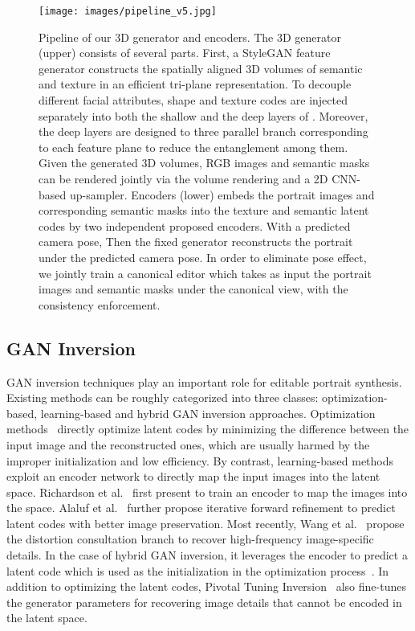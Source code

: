 \documentclass[acmtog]{acmart}
\begin{document}
\begin{figure*}[htbp]
  \centering
  \texttt{[image: images/pipeline\_v5.jpg]}
  \caption{Pipeline of our 3D generator and encoders. The 3D generator (upper) consists of several parts. First, a StyleGAN feature generator  constructs the spatially aligned 3D volumes of semantic and texture in an efficient tri-plane representation. To decouple different facial attributes, shape and texture codes are injected separately into both the shallow and the deep layers of . Moreover, the deep layers are designed to three parallel branch corresponding to each feature plane to reduce the entanglement among them. Given the generated 3D volumes, RGB images and semantic masks can be rendered jointly via the volume rendering and a 2D CNN-based up-sampler. Encoders (lower) embeds the portrait images and corresponding semantic masks into the texture and semantic latent codes by two independent proposed encoders. With a predicted camera pose, Then the fixed generator reconstructs the portrait under the predicted camera pose. In order to eliminate pose effect, we jointly train a canonical editor which takes as input the portrait images and semantic masks under the canonical view, with the consistency enforcement.}
  \Description{}
  \label{pipeline}
\end{figure*}

\subsection{GAN Inversion}

GAN inversion techniques play an important role for editable portrait synthesis. Existing methods can be roughly categorized into three classes: optimization-based, learning-based and hybrid GAN inversion approaches. Optimization methods~\cite{abdal2019image2stylegan,abdal2020image2stylegan++} directly optimize latent codes by minimizing the difference between the input image and the reconstructed ones, which are usually harmed by the improper initialization and low efficiency. By contrast, learning-based methods exploit an encoder network to directly map the input images into the latent space. Richardson et al.~\cite{richardson2021encoding} first present to train an encoder to map the images into the  space. Alaluf et al.~\cite{alaluf2021restyle} further propose iterative forward refinement to predict latent codes with better image preservation. Most recently, Wang et al.~\cite{wang2021HFGI} propose the distortion consultation branch to recover high-frequency image-specific details. In the case of hybrid GAN inversion, it leverages the encoder to predict a latent code which is used as the initialization in the optimization process~\cite{zhu2020indomain}. In addition to optimizing the latent codes, Pivotal Tuning Inversion~\cite{roich2021pivotal} also fine-tunes the generator parameters for recovering image details that cannot be encoded in the latent space.
\end{document}
